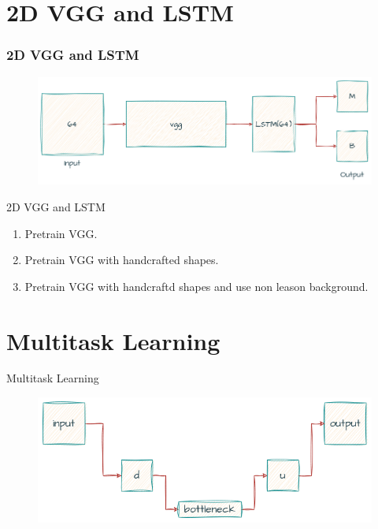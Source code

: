 \documentclass{beamer}
\begin{document}
\section{2D VGG and LSTM}
\begin{frame}
	\frametitle{2D VGG and LSTM}
	\begin{center}
		\begin{figure}
			\includegraphics[scale=0.3]{vgg-lstm.png}
			\centering
		\end{figure}
	\end{center}
\end{frame}

\begin{frame}{2D VGG and LSTM}
	\begin{enumerate}
		\item Pretrain VGG.
		\item Pretrain VGG with handcrafted shapes.
		\item Pretrain VGG with handcraftd shapes and use non leason background.
	\end{enumerate}
\end{frame}


\section{Multitask Learning}
\begin{frame}{Multitask Learning}
	\begin{center}
		\begin{figure}
			\includegraphics[scale=0.5]{unet.png}
			\centering
		\end{figure}
	\end{center}
\end{frame}
\end{document}
